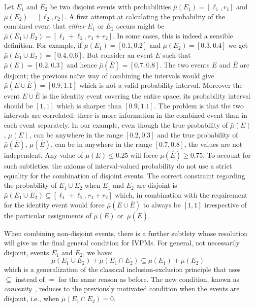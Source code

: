 \documentclass[english,reprint, aps, prl,superscriptaddress, showpacs,
showkeys, longbibliography, amsmath, amssymb]{revtex4-1}
\theoremstyle{plain}
\theoremstyle{definition}
\begin{document}
Let $E_1$ and $E_2$ be two disjoint events with probabilities
$\bar{\mu}(E_1)=[\ell_1,r_1]$ and $\bar{\mu}(E_2)=[\ell_2,r_2]$. A first attempt
at calculating the probability of the combined event that
\emph{either} $E_1$ or $E_2$ occurs might be
$\bar{\mu}(E_1\cup E_2) = [\ell_1+\ell_2,r_1+r_2]$. In some cases, this is
indeed a sensible definition. For example, if $\bar{\mu}(E_1)=[0.1,0.2]$ and
$\bar{\mu}(E_2)=[0.3,0.4]$ we get $\bar{\mu}(E_1\cup E_2) = [0.4,0.6]$. But
consider an event $E$ such that $\bar{\mu}(E)=[0.2,0.3]$ and hence
$\bar{\mu}(\overline{E})=[0.7,0.8]$. The two events $E$ and $\overline{E}$
are disjoint; the previous naïve way of combining the intervals would
give $\bar{\mu}(E\cup\overline{E})=[0.9,1.1]$ which is not a valid
probability interval. Moreover the event $E\cup\overline{E}$ is the
identity event covering the entire space; its probability interval
should be $[1,1]$ which is sharper than $[0.9,1.1]$. The problem is
that the two intervals are correlated: there is more information in
the combined event than in each event separately. In our example, even
though the true probability of {$\bar{\mu}(E)$}, $\mu(E)$, can be anywhere in the range
$[0.2,0.3]$ and the true probability of {$\bar{\mu}(\overline{E})$}, $\mu(\overline{E})$, can be in
anywhere in the range $[0.7,0.8]$, the values are not independent. Any
value of $\mu(E) \leq 0.25$ will force $\mu(\overline{E})\geq
0.75$. To account for such subtleties, the axioms of interval-valued
probability do not use a strict equality for the combination of
disjoint events. The correct constraint regarding the probability of
$E_1\cup E_2$ when $E_1$ and $E_2$ are disjoint is
$\bar{\mu}(E_1\cup E_2) \subseteq [\ell_1+\ell_2,r_1+r_2]$ which, in
combination with the requirement for the identity event would force
$\bar{\mu}(E \cup \overline{E})$ to always be $[1,1]$ irrespective of the
particular assignments of $\bar{\mu}(E)$ or~$\bar{\mu}(\overline{E})$.

When combining non-disjoint events, there is a further subtlety whose
resolution will give us the final general condition for IVPMs. For
general, not necessarily disjoint, events $E_1$ and $E_2$, we have:
\begin{equation}
\bar{\mu}(E_1\cup E_2) + \bar{\mu}(E_1\cap E_2) \subseteq \bar{\mu}(E_1) + \bar{\mu}(E_2)
\label{eq:classicalconvex}
\end{equation}
which is a generalization of the classical inclusion-exclusion
principle that uses $\subseteq$ instead of $=$ for the same reason as
before. The new condition, known as
\emph{convexity}~\cite{Shapley1971,GilboaSchmeidler1994,Marinacci1999,Grabisch2016},
reduces to the previously
motivated condition when the events are disjoint, i.e., when
$\bar{\mu}(E_1\cap E_2) = 0$.
\end{document}

